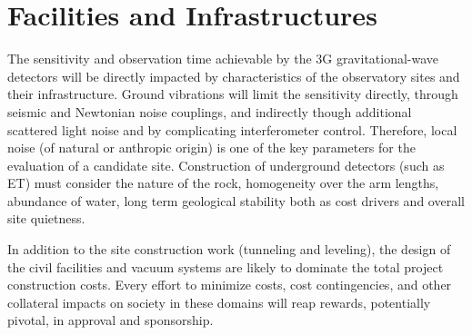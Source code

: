 \chapter{Facilities and Infrastructures}
\label{sec:Fac_Inf}
The sensitivity and observation time achievable by the 3G gravitational-wave detectors will be directly impacted by characteristics of the observatory sites and their infrastructure.
Ground vibrations will limit the sensitivity directly, through seismic and Newtonian noise couplings, and indirectly though additional scattered light noise and by complicating interferometer control.
Therefore, local noise (of natural or anthropic origin) is one of the key parameters for the evaluation of a candidate site.  Construction of underground detectors (such as ET) must consider the nature of the rock, homogeneity over the arm lengths, abundance of water, long term geological stability both as cost drivers and overall site quietness. 

In addition to the site construction work (tunneling and leveling), the design of the 
civil facilities and vacuum systems are likely to dominate the total project construction costs.  Every effort to minimize costs, cost %
contingencies, and other collateral impacts on society in these domains will reap rewards,  potentially pivotal, in approval and sponsorship.

